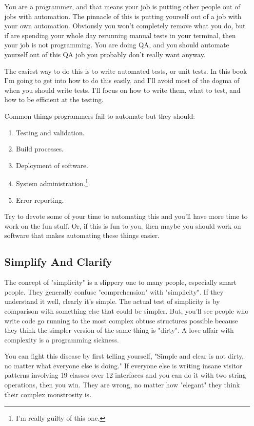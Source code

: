 You are a programmer, and that means your job is putting other people out of jobs with automation.
The pinnacle of this is putting yourself out of a job with your own automation.  Obviously you won't
completely remove what you do, but if are spending your whole day rerunning manual tests in your
terminal, then your job is not programming.  You are doing QA, and you should automate yourself out
of this QA job you probably don't really want anyway.

The easiest way to do this is to write automated tests, or unit tests.  In this book I'm going to get into
how to do this easily, and I'll avoid most of the dogma of when you should write tests.  I'll focus on 
how to write them, what to test, and how to be efficient at the testing.

Common things programmers fail to automate but they should:

\begin{enumerate}
\item Testing and validation.
\item Build processes.
\item Deployment of software.
\item System administration.\footnote{I'm really guilty of this one.}
\item Error reporting.
\end{enumerate}

Try to devote some of your time to automating this and you'll have more time to work on the fun stuff.
Or, if this is fun to you, then maybe you should work on software that makes automating these things
easier.


\subsection{Simplify And Clarify}

The concept of "simplicity" is a slippery one to many people, especially smart
people.  They generally confuse "comprehension" with "simplicity".  If they
understand it well, clearly it's simple.  The actual test of simplicity is by
comparison with something else that could be simpler.  But, you'll see people
who write code go running to the most complex obtuse structures possible
because they think the simpler version of the same thing is "dirty".  A love
affair with complexity is a programming sickness.

You can fight this disease by first telling yourself, "Simple and clear is
not dirty, no matter what everyone else is doing."  If everyone else is writing
insane visitor patterns involving 19 classes over 12 interfaces and you can do
it with two string operations, then you win.  They are wrong, no matter how 
"elegant" they think their complex monstrosity is.

